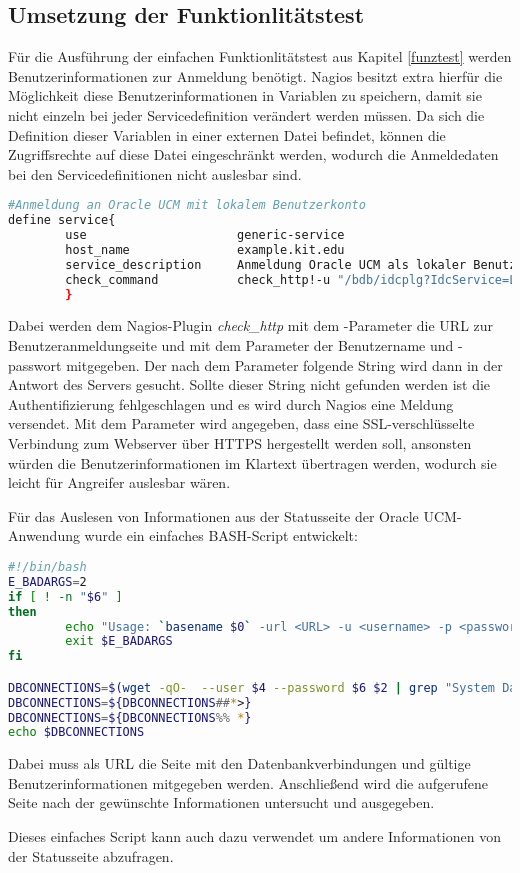 \subsection{Umsetzung der Funktionlitätstest}

Für die Ausführung der einfachen Funktionlitätstest aus Kapitel \ref{funztest} werden Benutzerinformationen zur Anmeldung benötigt.
Nagios besitzt extra hierfür die Möglichkeit diese Benutzerinformationen in Variablen zu speichern, damit sie nicht einzeln bei jeder Servicedefinition verändert werden müssen.
Da sich die Definition dieser Variablen in einer externen Datei befindet, können die Zugriffsrechte auf diese Datei eingeschränkt werden, wodurch die Anmeldedaten bei den Servicedefinitionen nicht auslesbar sind.

\begin{lstlisting}[captionpos=b, caption=Funktionalitätstest der Benutzeranmeldung, label=userauthdef, breaklines = true, language=sh]
#Anmeldung an Oracle UCM mit lokalem Benutzerkonto
define service{
        use                     generic-service
        host_name               example.kit.edu
        service_description     Anmeldung Oracle UCM als lokaler Benutzer
        check_command           check_http!-u "/bdb/idcplg?IdcService=LOGIN&Action=GetTemplatePage&Page=HOME\_PAGE&Auth=Internet"  -a $USER3$:$USER4$ -e "Sie sind angemeldet als" -S
        }
\end{lstlisting}


Dabei werden dem Nagios-Plugin \textit{check\_http} mit dem -Parameter die URL zur Benutzeranmeldungseite und mit dem Parameter  der Benutzername und -passwort mitgegeben.
Der nach dem Parameter  folgende String wird dann in der Antwort des Servers gesucht.
Sollte dieser String nicht gefunden werden ist die Authentifizierung fehlgeschlagen und es wird durch Nagios eine Meldung versendet.
Mit dem Parameter  wird angegeben, dass eine \gls{SSL}-verschlüsselte Verbindung zum Webserver über HTTPS hergestellt werden soll, ansonsten würden die Benutzerinformationen im Klartext übertragen werden, wodurch sie leicht für Angreifer auslesbar wären.

Für das Auslesen von Informationen aus der Statusseite der Oracle UCM-Anwendung wurde ein einfaches BASH-Script entwickelt:

\begin{lstlisting}[captionpos=b, caption=Auslesen der Verbindungen zur Datenbank, label=dbcon, breaklines = true, language=sh]
#!/bin/bash
E_BADARGS=2
if [ ! -n "$6" ]
then
        echo "Usage: `basename $0` -url <URL> -u <username> -p <password>"
        exit $E_BADARGS
fi

DBCONNECTIONS=$(wget -qO-  --user $4 --password $6 $2 | grep "System Database")
DBCONNECTIONS=${DBCONNECTIONS##*>}
DBCONNECTIONS=${DBCONNECTIONS%% *}
echo $DBCONNECTIONS
\end{lstlisting}

Dabei muss als URL die Seite mit den Datenbankverbindungen und gültige Benutzerinformationen mitgegeben werden.
Anschließend wird die aufgerufene Seite nach der gewünschte Informationen untersucht und ausgegeben.

Dieses einfaches Script kann auch dazu verwendet um andere Informationen von der Statusseite abzufragen.